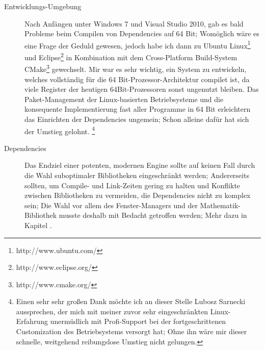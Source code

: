 \begin{description}

	\item[Entwicklungs-Umgebung]
	Nach Anfängen unter Windows 7 und Visual Studio 2010, gab es bald Probleme beim Compilen von Dependencies auf 
	64 Bit; Womöglich wäre es eine Frage der Geduld gewesen, jedoch habe ich dann zu 
	Ubuntu Linux\footnote{http://www.ubuntu.com/} und Eclipse\footnote{http://www.eclipse.org/} in 
	Kombination mit dem Cross-Platform Build-System CMake\footnote{http://www.cmake.org/} gewechselt. Mir war es sehr 	
	wichtig, ein System zu entwickeln, welches vollständig für die 64 Bit-Prozessor-Architektur compilet ist, da viele 
	Register der heutigen 64Bit-Prozessoren sonst ungenutzt bleiben.
	Das Paket-Management der Linux-basierten Betriebsysteme und die konsequente Implementierung fast aller Programme in 64 
	Bit erleichtern das Einrichten der Dependencies ungemein; Schon alleine dafür hat sich der Umstieg 
	gelohnt.
	\footnote{Einen sehr sehr großen Dank möchte ich an dieser Stelle Lubosz Sarnecki aussprechen, der mich mit 
	meiner zuvor sehr eingeschränkten Linux-Erfahrung unermüdlich mit Profi-Support bei der fortgeschrittenen Customization 
	des Betriebsystems versorgt hat; Ohne ihn wäre mir dieser schnelle, weitgehend reibungslose Umstieg nicht gelungen.}

	\item[Dependencies]
	Das Endziel einer potenten, modernen Engine sollte auf keinen Fall durch die Wahl suboptimaler Bibliotheken 
	eingeschränkt werden; Andererseits sollten, um Compile- und Link-Zeiten gering zu halten und Konflikte zwischen 
	Bibliotheken zu vermeiden, die Dependencies nicht zu komplex sein; Die Wahl vor allem des Fenster-Managers und der
	Mathematik-Bibliothek musste deshalb mit Bedacht getroffen werden; Mehr dazu in Kapitel \label{sec:dependencies}.
	
	
	

\end{description}
